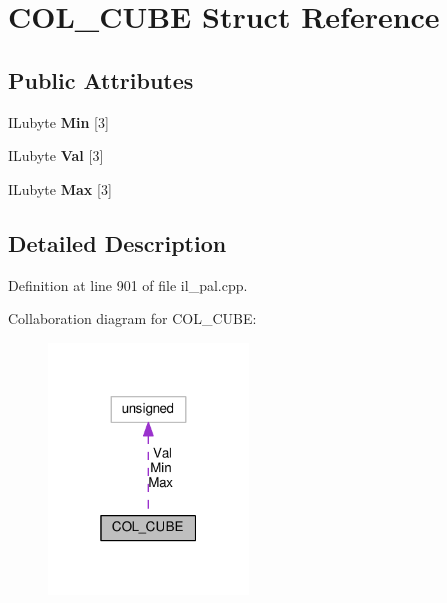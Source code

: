 \hypertarget{structCOL__CUBE}{}\section{C\+O\+L\+\_\+\+C\+U\+BE Struct Reference}
\label{structCOL__CUBE}
\subsection*{Public Attributes}
\begin{DoxyCompactItemize}
\item 
\mbox{\label{structCOL__CUBE_ac986e073e55985163badf6f4721c3a1e}} 
I\+Lubyte {\bfseries Min} \mbox{[}3\mbox{]}
\item 
\mbox{\label{structCOL__CUBE_a0f51973b57a6eb28fe805f24c10b1b98}} 
I\+Lubyte {\bfseries Val} \mbox{[}3\mbox{]}
\item 
\mbox{\label{structCOL__CUBE_aab205483de4cb6aee8b7e7dc460867ec}} 
I\+Lubyte {\bfseries Max} \mbox{[}3\mbox{]}
\end{DoxyCompactItemize}


\subsection{Detailed Description}


Definition at line 901 of file il\+\_\+pal.\+cpp.



Collaboration diagram for C\+O\+L\+\_\+\+C\+U\+BE\+:
\nopagebreak
\begin{figure}[H]
\begin{center}
\leavevmode
\includegraphics[width=151pt]{dc/de4/structCOL__CUBE__coll__graph}
\end{center}
\end{figure}


